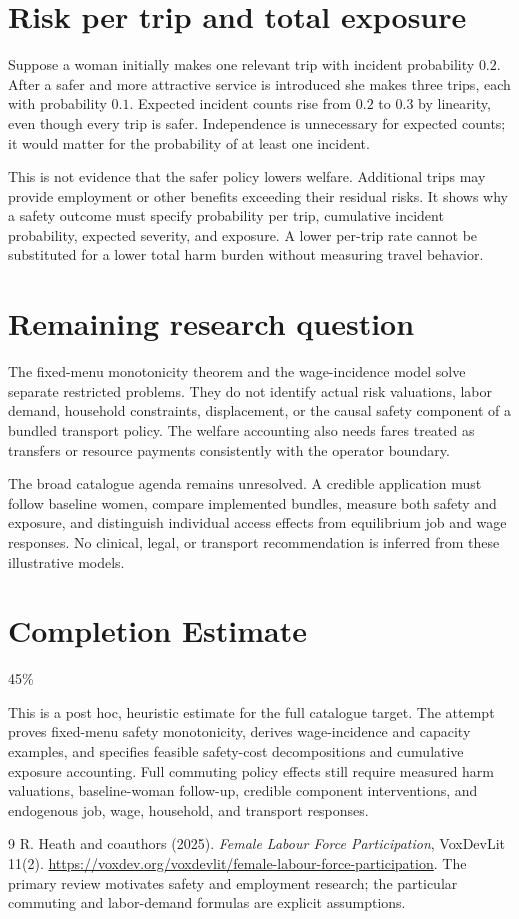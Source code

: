 \documentclass[11pt,a4paper]{article}
\begin{document}
\section{Risk per trip and total exposure}
Suppose a woman initially makes one relevant trip with incident probability $0.2$. After a safer and more attractive service is introduced she makes three trips, each with probability $0.1$. Expected incident counts rise from $0.2$ to $0.3$ by linearity, even though every trip is safer. Independence is unnecessary for expected counts; it would matter for the probability of at least one incident.

This is not evidence that the safer policy lowers welfare. Additional trips may provide employment or other benefits exceeding their residual risks. It shows why a safety outcome must specify probability per trip, cumulative incident probability, expected severity, and exposure. A lower per-trip rate cannot be substituted for a lower total harm burden without measuring travel behavior.
\section{Remaining research question}
The fixed-menu monotonicity theorem and the wage-incidence model solve separate restricted problems. They do not identify actual risk valuations, labor demand, household constraints, displacement, or the causal safety component of a bundled transport policy. The welfare accounting also needs fares treated as transfers or resource payments consistently with the operator boundary.

The broad catalogue agenda remains unresolved. A credible application must follow baseline women, compare implemented bundles, measure both safety and exposure, and distinguish individual access effects from equilibrium job and wage responses. No clinical, legal, or transport recommendation is inferred from these illustrative models.

\section{Completion Estimate}
45\%

This is a post hoc, heuristic estimate for the full catalogue target.
The attempt proves fixed-menu safety monotonicity, derives wage-incidence and capacity examples, and specifies feasible safety-cost decompositions and cumulative exposure accounting. Full commuting policy effects still require measured harm valuations, baseline-woman follow-up, credible component interventions, and endogenous job, wage, household, and transport responses.

\begin{thebibliography}{9}
 R. Heath and coauthors (2025).
\emph{Female Labour Force Participation}, VoxDevLit 11(2).
\url{https://voxdev.org/voxdevlit/female-labour-force-participation}.
The primary review motivates safety and employment research; the particular commuting and labor-demand formulas are explicit assumptions.
\end{thebibliography}
\end{document}
